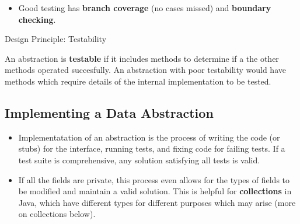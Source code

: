 \documentclass[letterpaper] {article}
\begin{document}
    \begin{itemize}
        \item Good testing has \textbf{branch coverage} (no cases missed) and \textbf{boundary checking}.
    \end{itemize}

   \begin{framed}
        \begin{center}
            Design Principle: Testability
        \end{center}
        An abstraction is \textbf{testable} if it includes methods to determine if a the other methods operated succesfully. An abstraction with poor testability would have methods which require details of the internal implementation to be tested. 
    \end{framed}

    \subsection{Implementing a Data Abstraction}
    \begin{itemize}
        \item Implementatation of an abstraction is the process of writing the code (or stubs) for the interface, running tests, and fixing code for failing tests. If a test suite is comprehensive, any solution satisfying all tests is valid. 
        \item If all the fields are private, this process even allows for the types of fields to be modified and maintain a valid solution. This is helpful for \textbf{collections} in Java, which have different types for different purposes which may arise (more on collections below).
    \end{itemize}
\end{document}
